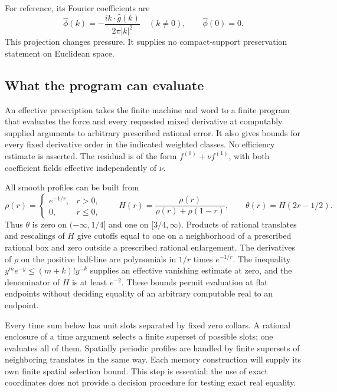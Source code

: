 \documentclass[11pt]{article}
\theoremstyle{remark}
\begin{document}
For reference, its Fourier coefficients are
\begin{equation}\label{eq:projection}
 \widehat\phi(k)=-\frac{i k\cdot\widehat g(k)}{2\pi|k|^2}
 \quad(k\ne0),\qquad \widehat\phi(0)=0.
\end{equation}
This projection changes pressure. It supplies no compact-support
preservation statement on Euclidean space.

\subsection{What the program can evaluate}

An effective prescription takes the finite machine and word to a finite
program that evaluates the force and every requested mixed derivative
at computably supplied arguments to arbitrary prescribed rational error.
It also gives bounds for every fixed derivative order in the indicated
weighted classes. No efficiency estimate is asserted. The residual is
of the form $f^{(0)}+\nu f^{(1)}$, with both coefficient fields effective
independently of $\nu$.

All smooth profiles can be built from
\[
 \rho(r)=\begin{cases}e^{-1/r},&r>0,\\0,&r\leq0,\end{cases}
 \qquad H(r)=\frac{\rho(r)}{\rho(r)+\rho(1-r)},
 \qquad \theta(r)=H(2r-1/2).
\]
Thus $\theta$ is zero on $(-\infty,1/4]$ and one on $[3/4,\infty)$.
Products of rational translates and rescalings of $H$ give cutoffs equal
to one on a neighborhood of a prescribed rational box and zero outside
a prescribed rational enlargement. The derivatives of $\rho$ on the
positive half-line are polynomials in $1/r$ times $e^{-1/r}$.
The inequality $y^m e^{-y}\leq(m+k)!y^{-k}$ supplies an effective
vanishing estimate at zero, and the denominator of $H$ is at least
$e^{-2}$. These bounds permit evaluation at flat endpoints without
deciding equality of an arbitrary computable real to an endpoint.

Every time sum below has unit slots separated by fixed zero collars.
A rational enclosure of a time argument selects a finite superset of
possible slots; one evaluates all of them. Spatially periodic profiles
are handled by finite supersets of neighboring translates in the same
way. Each memory construction will supply its own finite spatial
selection bound. This step is essential: the use of exact coordinates
does not provide a decision procedure for testing exact real equality.
\end{document}
